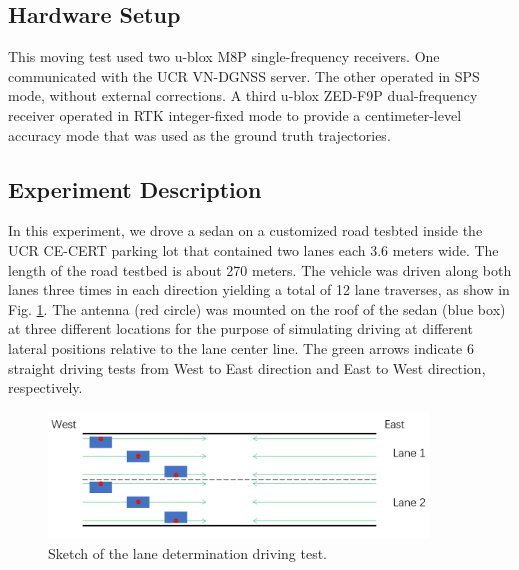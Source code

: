 \documentclass[letterpaper, 10 pt,onecolumn]{article}
\begin{document}
	\subsection{Hardware Setup}
	This moving test used two u-blox M8P single-frequency receivers. 
	One communicated with the UCR VN-DGNSS server. The other operated in SPS mode, without external corrections. A third u-blox ZED-F9P dual-frequency receiver operated in RTK integer-fixed mode to provide a centimeter-level accuracy mode that was used as the ground truth trajectories.
	
	\subsection{Experiment Description}
	In this experiment, we drove a sedan on a customized road tesbted inside the UCR CE-CERT parking lot that contained two lanes each 3.6 meters wide. The length of the road testbed is about 270 meters. The vehicle was driven along both lanes three times in each direction yielding a total of 12 lane traverses, as show in Fig. \ref{fig:LDsk}.
	The antenna (red circle) was mounted on the roof of the sedan (blue box) at three different locations for the purpose of simulating driving at different lateral positions relative to the lane center line. The green arrows indicate 6 straight driving tests from West to East direction and East to West direction, respectively. 
	\begin{figure}[H]		
		\centering		
		\includegraphics[width=0.9\textwidth]{figures/LDsketch.png}	
		\caption{Sketch of the lane determination driving test.}		
		\label{fig:LDsk}	
	\end{figure}
	
\end{document}
